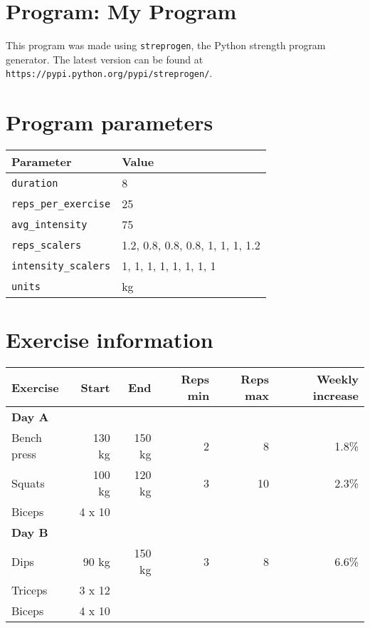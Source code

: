 \documentclass[12pt, a4paper]{article}%
\begin{document}
\large

\section*{Program: My Program}

This program was made using \verb|streprogen|,
the Python strength program generator.
The latest version can be found at \\
\verb|https://pypi.python.org/pypi/streprogen/|.


\section*{Program parameters}
\begin{tabular}{l|l}
	\textbf{Parameter} & \textbf{Value} \\ \hline
	\verb|duration|             & 8 \\
	\verb|reps_per_exercise|    & 25 \\
	\verb|avg_intensity|        & 75 \\
	\verb|reps_scalers|         & 1.2, 0.8, 0.8, 0.8, 1, 1, 1, 1.2 \\
	\verb|intensity_scalers|    & 1, 1, 1, 1, 1, 1, 1, 1 \\
	\verb|units|                & kg
\end{tabular}




\section*{Exercise information}
\begin{tabular}{lrrrrr}
    \textbf{Exercise} & \textbf{Start} & \textbf{End} & \textbf{Reps min}
    & \textbf{Reps max} & \textbf{Weekly increase} \\ \hline
      \textbf{ Day A } & & & & & \\ \hline
        \hspace{0.5em}Bench press & 130 kg &
         150 kg & 2 & 8 &
          1.8\%\\
        \hspace{0.5em}Squats & 100 kg &
         120 kg & 3 & 10 &
          2.3\%\\
       \hspace{0.5em}Biceps & 4 x 10 & & & & \\
      \textbf{ Day B } & & & & & \\ \hline
        \hspace{0.5em}Dips & 90 kg &
         150 kg & 3 & 8 &
          6.6\%\\
       \hspace{0.5em}Triceps & 3 x 12 & & & & \\
       \hspace{0.5em}Biceps & 4 x 10 & & & & \\
\end{tabular}
\end{document}
